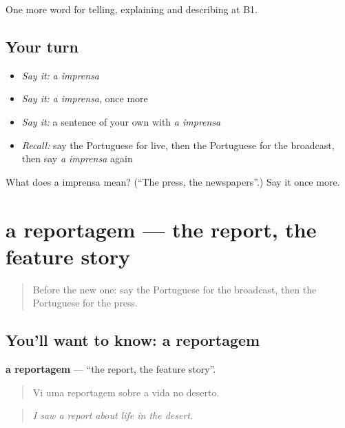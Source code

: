 \begin{grammarlens}[title={What you've built}]
One more word for telling, explaining and describing at B1.
\end{grammarlens}

\subsection*{Your turn}
\begin{itemize}
\raggedright
  \item \emph{Say it:} \emph{a imprensa}
  \item \emph{Say it:} \emph{a imprensa}, once more
  \item \emph{Say it:} a sentence of your own with \emph{a imprensa}
  \item \emph{Recall:} say the Portuguese for live, then the Portuguese for the broadcast, then say \emph{a imprensa} again
\end{itemize}

\begin{tcolorbox}[breakable,colback=teal!4,colframe=teal!35!black,title={Before you move on}]
What does a imprensa mean? (\textquotedblleft{}The press, the newspapers\textquotedblright{}.) Say it once more.
\end{tcolorbox}
\section[a reportagem]{a reportagem — the report, the feature story}

\label{lesson:PT-C279-reportagem}



\begin{quote}
Before the new one: say the Portuguese for the broadcast, then the Portuguese for the press.
\end{quote}

\subsection*{You'll want to know: a reportagem}
\textbf{a reportagem} — \textquotedblleft{}the report, the feature story\textquotedblright{}.

\begin{quote}
Vi uma reportagem sobre a vida no deserto.
\end{quote}

\begin{quote}
\emph{I saw a report about life in the desert.}
\end{quote}

